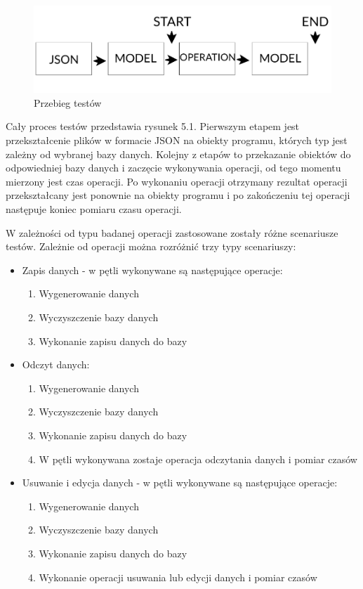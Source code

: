 \begin{figure}[h]
\centering
	\includegraphics[width=\linewidth]{img/database/operation-scheme.png}
	\caption{Przebieg testów}
	\label{fig: operation_scheme}
\end{figure}

Cały proces testów przedstawia rysunek 5.1.  Pierwszym etapem jest przekształcenie plików w formacie JSON na obiekty programu, których typ jest zależny od wybranej bazy danych. Kolejny z etapów to przekazanie obiektów do odpowiedniej bazy danych i zaczęcie wykonywania operacji, od tego momentu mierzony jest czas operacji. Po wykonaniu operacji otrzymany rezultat operacji przekształcany jest ponownie na obiekty programu i po zakończeniu tej operacji następuje koniec pomiaru czasu operacji. 

W zależności od typu badanej operacji zastosowane zostały różne scenariusze testów. Zależnie od operacji można rozróżnić trzy typy scenariuszy: 

\begin{itemize}
	 \item Zapis danych - w pętli wykonywane są następujące operacje:
	 
	 \begin{enumerate}
	 \item Wygenerowanie danych
	 \item Wyczyszczenie bazy danych
	 \item Wykonanie zapisu danych do bazy
	 \end{enumerate}
	 
	 \item Odczyt danych:
	 
	  \begin{enumerate}
	 \item Wygenerowanie danych
	 \item Wyczyszczenie bazy danych
	 \item Wykonanie zapisu danych do bazy
	 \item W pętli wykonywana zostaje operacja odczytania danych i pomiar czasów
	 \end{enumerate}
	 
	 \item Usuwanie i edycja danych - w pętli wykonywane są następujące operacje:
	 
	 \begin{enumerate}
	 \item Wygenerowanie danych
	 \item Wyczyszczenie bazy danych
	 \item Wykonanie zapisu danych do bazy
	 \item Wykonanie operacji usuwania lub edycji danych i pomiar czasów
	 \end{enumerate}
	 
\end{itemize}


